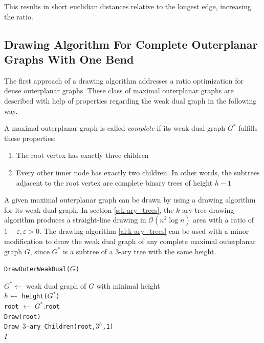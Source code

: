 This results in short euclidian distances relative to the longest edge, increasing the ratio.\\

\subsection{Drawing Algorithm For Complete Outerplanar Graphs With One Bend}
The first approach of a drawing algorithm addresses a ratio optimization for dense outerplanar graphs. These class of maximal outerplanar graphs are described with help of properties regarding the weak dual graph in the following way.
\begin{definition}\label{def:complete_maximal_outerplanar}
	A maximal outerplanar graph is called \emph{complete} if its weak dual graph $G^*$ fulfills these properties:
	\begin{enumerate}
		\item The root vertex has exactly three children
		\item Every other inner node has exactly two children. In other words, the subtrees adjacent to the root vertex are complete binary trees of height $h-1$
	\end{enumerate}
\end{definition}
A given maximal outerplanar graph can be drawn by using a drawing algorithm for its weak dual graph. In section \ref{s:k-ary_trees}, the $k$-ary tree drawing algorithm produces a straight-line drawing in $\mathcal{O}(n^2 \log n)$ area with a ratio of $1+\varepsilon,\varepsilon>0$. The drawing algorithm \ref{al:k-ary_trees} can be used with a minor modification to draw the weak dual graph of any complete maximal outerplanar graph $G$, since $G^*$ is a subtree of a $3$-ary tree with the same height.\\

\begin{algorithm}[H]
	\caption{\texttt{DrawOuterWeakDual($G$)}}\label{al:drawouterweakdual}
	$G^* \gets$ weak dual graph of $G$ with minimal height\\
	$h \gets$ \texttt{height($G^*$)}\\
	\texttt{root} $\gets$ $G^*$.\texttt{root}\\
	\texttt{Draw(root)}\\
	\texttt{Draw\_$3$-ary\_Children(\texttt{root},$3^h$,1)}\\
	\Return $\Gamma$
\end{algorithm}

